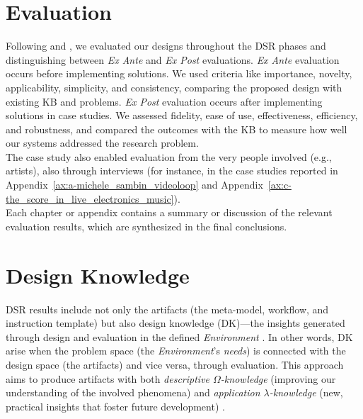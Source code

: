 \section{Evaluation}
Following \cite{sonnenberg2012evaluations} and \cite{brocke2020introduction}, we evaluated our designs throughout the DSR phases and distinguishing between \textit{Ex Ante} and \textit{Ex Post} evaluations. \textit{Ex Ante} evaluation occurs before implementing solutions. We used criteria like importance, novelty, applicability, simplicity, and consistency, comparing the proposed design with existing KB and problems. \textit{Ex Post} evaluation occurs after implementing solutions in case studies. We assessed fidelity, ease of use, effectiveness, efficiency, and robustness, and compared the outcomes with the KB to measure how well our systems addressed the research problem. \\  
The case study also enabled evaluation from the very people involved (e.g., artists), also through interviews (for instance, in the case studies reported in Appendix~\ref{ax:a-michele_sambin_videoloop} and Appendix~\ref{ax:c-the_score_in_live_electronics_music}).\\
Each chapter or appendix contains a summary or discussion of the relevant evaluation results, which are synthesized in the final conclusions.

\section{Design Knowledge}
DSR results include not only the artifacts (the meta-model, workflow, and instruction template) but also design knowledge (DK)—the insights generated through design and evaluation in the defined \textit{Environment} \cite{brocke2020introduction}. In other words, DK arise when the problem space (the \textit{Environment}’s \textit{needs}) is connected with the design space (the artifacts) and vice versa, through evaluation. This approach aims to produce artifacts with both \textit{descriptive $\Omega$-knowledge} (improving our understanding of the involved phenomena) and \textit{application $\lambda$-knowledge} (new, practical insights that foster future development) \cite{gregor2013positioning, winter2013restructuring}.

